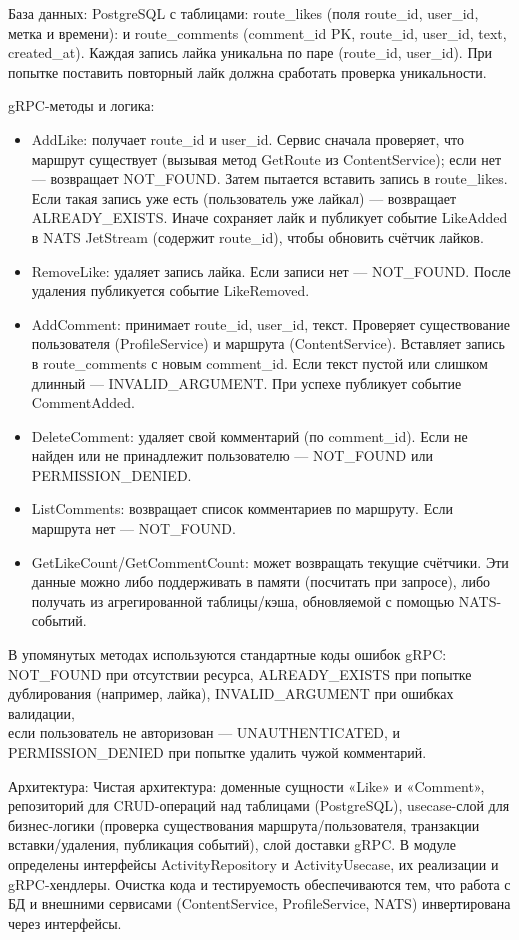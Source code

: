 База данных: PostgreSQL с таблицами: route\_likes (поля route\_id, user\_id, метка и времени): и route\_comments (comment\_id PK, route\_id, user\_id, text, created\_at). Каждая запись лайка уникальна по паре (route\_id, user\_id). При попытке поставить повторный лайк должна сработать проверка уникальности. 

gRPC-методы и логика:
\begin{itemize}
    \item AddLike: получает route\_id и user\_id. Сервис сначала проверяет, что маршрут существует (вызывая метод GetRoute из ContentService); если нет — возвращает NOT\_FOUND. Затем пытается вставить запись в route\_likes. Если такая запись уже есть (пользователь уже лайкал) — возвращает ALREADY\_EXISTS. Иначе сохраняет лайк и публикует событие LikeAdded в NATS JetStream (содержит route\_id), чтобы обновить счётчик лайков.
    \item RemoveLike: удаляет запись лайка. Если записи нет — NOT\_FOUND. После удаления публикуется событие LikeRemoved.
    \item AddComment: принимает route\_id, user\_id, текст. Проверяет существование пользователя (ProfileService) и маршрута (ContentService). Вставляет запись в route\_comments с новым comment\_id. Если текст пустой или слишком длинный — INVALID\_ARGUMENT. При успехе публикует событие CommentAdded.
    \item DeleteComment: удаляет свой комментарий (по comment\_id). Если не найден или не принадлежит пользователю — NOT\_FOUND или \\ PERMISSION\_DENIED.
    \item ListComments: возвращает список комментариев по маршруту. Если маршрута нет — NOT\_FOUND.
    \item GetLikeCount/GetCommentCount: может возвращать текущие счётчики. Эти данные можно либо поддерживать в памяти (посчитать при запросе), либо получать из агрегированной таблицы/кэша, обновляемой с помощью NATS-событий.
\end{itemize}
В упомянутых методах используются стандартные коды ошибок gRPC: \\ NOT\_FOUND при отсутствии ресурса, ALREADY\_EXISTS при попытке дублирования (например, лайка), INVALID\_ARGUMENT при ошибках валидации, \\ если пользователь не авторизован — UNAUTHENTICATED,  и PERMISSION\_DENIED при попытке удалить чужой комментарий.

Архитектура: Чистая архитектура: доменные сущности «Like» и «Comment», репозиторий для CRUD-операций над таблицами (PostgreSQL), usecase-слой для бизнес-логики (проверка существования маршрута/пользователя, транзакции вставки/удаления, публикация событий), слой доставки gRPC. В модуле определены интерфейсы ActivityRepository и ActivityUsecase, их реализации и gRPC-хендлеры. Очистка кода и тестируемость обеспечиваются тем, что работа с БД и внешними сервисами (ContentService, ProfileService, NATS) инвертирована через интерфейсы.

